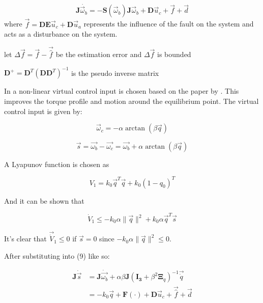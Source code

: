\begin{equation}
    \mathbf{J}\dot{\vec{\omega}_{b}}=-\mathbf{S}(\vec{\omega}_{b})\mathbf{J}\vec{\omega}_{b}+\mathbf{D}\vec{u}_{c}+\vec{f}+\vec{d}
\end{equation} 
where $\vec{f}=\mathbf{D}\mathbf{E}\vec{u}_{c}+\mathbf{D}\vec{u}_{a}$ represents the influence of the fault on the system and acts as a disturbance on the system.


let $\Delta \vec{f}=\vec{f}-\vec{\hat{f}}$ be the estimation error and $\Delta \vec{f}$ is bounded



$\mathbf{D}^+=\mathbf{D}^T(\mathbf{D}\mathbf{D}^T)^{-1}$ is the pseudo inverse matrix

In \cite{shenActiveFaulttolerantControl2019} a non-linear virtual control input is chosen based on the paper by \cite{kimRobustBacksteppingControl2003}. This improves the torque profile and motion around the equilibrium point. The virtual control input is given by:

\begin{equation}\vec{\omega}_{c}=-\alpha\arctan(\beta\vec{q})\end{equation}

\begin{equation}\vec{s}=\vec{\omega_{b}}-\vec{\omega_{c}}=\vec{\omega_{b}}+\alpha\arctan(\beta\vec{q})\end{equation}

A Lyapunov function is chosen as 

\begin{equation}V_{1}=k_{0}\vec{q}^T\vec{q}+k_{0}(1-q_{0})^T\end{equation}

And it can be shown that 

\begin{equation}\dot{V}_{1}\leq-k_{0}\alpha \lVert \vec{q} \rVert^{2}+k_0\alpha\vec{q}^T\vec{s}\end{equation}

It's clear that $\vec{\dot{V}}_{1}\leq0$ if $\vec{s}=0$ since $-k_{0}\alpha \lVert \vec{q} \rVert^{2}\leq0$.

After substituting into (9) like so:

\begin{equation}
    \begin{split}
        \mathbf{J}\dot{\vec{s}}&=
        \mathbf{J}\dot{\vec{\omega_b}} + \alpha\beta\mathbf{J}(\mathbf{I_3}+\beta^2\mathbf{\Xi}_q)^{-1}\vec{\dot{q}}\\
        &=-k_0\vec{q}+\mathbf{F}(\cdot)+\mathbf{D}\vec{u}_{c}+\vec{\hat{f}}+\vec{d}
    \end{split}
\end{equation}

